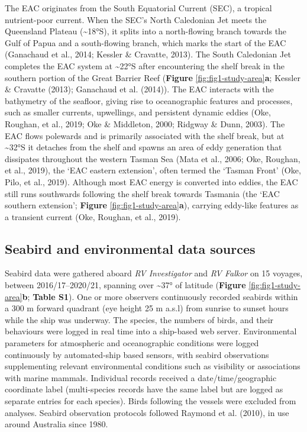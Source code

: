 \documentclass{article}
\begin{document}
\begin{linenumbers}
The EAC originates from the South Equatorial Current (SEC), a tropical nutrient-poor current. When the SEC's North Caledonian Jet meets the Queensland Plateau (\textasciitilde18°S), it splits into a north-flowing branch towards the Gulf of Papua and a south-flowing branch, which marks the start of the EAC (Ganachaud et al., 2014; Kessler \& Cravatte, 2013). The South Caledonian Jet completes the EAC system at \textasciitilde22°S after encountering the shelf break in the southern portion of the Great Barrier Reef (\textbf{Figure} \ref{fig:fig1-study-area}\textbf{a}; Kessler \& Cravatte (2013); Ganachaud et al. (2014)). The EAC interacts with the bathymetry of the seafloor, giving rise to oceanographic features and processes, such as smaller currents, upwellings, and persistent dynamic eddies (Oke, Roughan, et al., 2019; Oke \& Middleton, 2000; Ridgway \& Dunn, 2003). The EAC flows polewards and is primarily associated with the shelf break, but at \textasciitilde32°S it detaches from the shelf and spawns an area of eddy generation that dissipates throughout the western Tasman Sea (Mata et al., 2006; Oke, Roughan, et al., 2019), the `EAC eastern extension', often termed the `Tasman Front' (Oke, Pilo, et al., 2019). Although most EAC energy is converted into eddies, the EAC still runs southwards following the shelf break towards Tasmania (the `EAC southern extension'; \textbf{Figure} \ref{fig:fig1-study-area}\textbf{a}), carrying eddy-like features as a transient current (Oke, Roughan, et al., 2019).

\hypertarget{seabird-and-environmental-data-sources}{%
\subsection{Seabird and environmental data sources}\label{seabird-and-environmental-data-sources}}

Seabird data were gathered aboard \emph{RV Investigator} and \emph{RV Falkor} on 15 voyages, between 2016/17--2020/21, spanning over \textasciitilde37° of latitude (\textbf{Figure} \ref{fig:fig1-study-area}\textbf{b}; \textbf{Table S1}). One or more observers continuously recorded seabirds within a 300 m forward quadrant (eye height 25 m a.s.l) from sunrise to sunset hours while the ship was underway. The species, the numbers of birds, and their behaviours were logged in real time into a ship-based web server. Environmental parameters for atmospheric and oceanographic conditions were logged continuously by automated-ship based sensors, with seabird observations supplementing relevant environmental conditions such as visibility or associations with marine mammals. Individual records received a date/time/geographic coordinate label (multi-species records have the same label but are logged as separate entries for each species). Birds following the vessels were excluded from analyses. Seabird observation protocols followed Raymond et al. (2010), in use around Australia since 1980.


\end{linenumbers}
\end{document}
